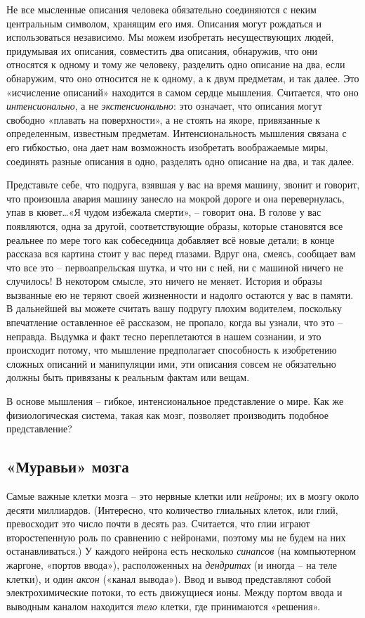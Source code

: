 \documentclass[../main.tex]{subfiles}
\begin{document}
Не все мысленные описания человека обязательно соединяются с неким центральным символом, хранящим его имя. Описания могут рождаться и использоваться независимо. Мы можем изобретать несуществующих людей, придумывая их описания, совместить два описания, обнаружив, что они относятся к одному и тому же человеку, разделить одно описание на два, если обнаружим, что оно относится не к одному, а к двум предметам, и так далее. Это «исчисление описаний» находится в самом сердце мышления. Считается, что оно \emph{интенсионально}, а не \emph{экстенсионально}: это означает, что описания могут свободно «плавать на поверхности», а не стоять на якоре, привязанные к определенным, известным предметам. Интенсиональность мышления связана с его гибкостью, она дает нам возможность изобретать воображаемые миры, соединять разные описания в одно, разделять одно описание на два, и так далее.

Представьте себе, что подруга, взявшая у вас на время машину, звонит и говорит, что произошла авария машину занесло на мокрой дороге и она перевернулась, упав в кювет\ldots «Я чудом избежала смерти», \--- говорит она. В голове у вас появляются, одна за другой, соответствующие образы, которые становятся все реальнее по мере того как собеседница добавляет всё новые детали; в конце рассказа вся картина стоит у вас перед глазами. Вдруг она, смеясь, сообщает вам что все это \--- первоапрельская шутка, и что ни с ней, ни с машиной ничего не случилось! В некотором смысле, это ничего не меняет. История и образы вызванные ею не теряют своей жизненности и надолго остаются у вас в памяти. В дальнейшей вы можете считать вашу подругу плохим водителем, поскольку впечатление оставленное её рассказом, не пропало, когда вы узнали, что это \--- неправда. Выдумка и факт тесно переплетаются в нашем сознании, и это происходит потому, что мышление предполагает способность к изобретению сложных описаний и манипуляции ими, эти описания совсем не обязательно должны быть привязаны к реальным фактам или вещам.

В основе мышления \--- гибкое, интенсиональное представление о мире. Как же физиологическая система, такая как мозг, позволяет производить подобное представление?


\subsection{«Муравьи» мозга}

Самые важные клетки мозга \--- это нервные клетки или \emph{нейроны}; их в мозгу около десяти миллиардов. (Интересно, что количество глиальных клеток, или глий, превосходит это число почти в десять раз. Считается, что глии играют второстепенную роль по сравнению с нейронами, поэтому мы не будем на них останавливаться.) У каждого нейрона есть несколько \emph{синапсов} (на компьютерном жаргоне, «портов ввода»), расположенных на \emph{дендритах} (и иногда \--- на теле клетки), и один \emph{аксон} («канал вывода»). Ввод и вывод представляют собой электрохимические потоки, то есть движущиеся ионы. Между портом ввода и выводным каналом находится \emph{тело} клетки, где принимаются «решения».
\end{document}
